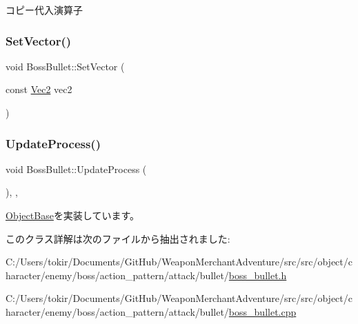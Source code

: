コピー代入演算子 

\mbox{\label{class_boss_bullet_a29bc4989a8b16a9da0daa3da92fb0e0a}} 
\subsubsection{\texorpdfstring{Set\+Vector()}{SetVector()}}
{\footnotesize\ttfamily void Boss\+Bullet\+::\+Set\+Vector (\begin{DoxyParamCaption}\item[{const \mbox{\hyperlink{common_8h_ae148fff5818e9444b4ab2288829559bf}{Vec2}}}]{vec2 }\end{DoxyParamCaption})\hspace{0.3cm}{\ttfamily [inline]}}

\mbox{\label{class_boss_bullet_a8e9923194c03eb0d4225ed8dae409f29}} 
\subsubsection{\texorpdfstring{Update\+Process()}{UpdateProcess()}}
{\footnotesize\ttfamily void Boss\+Bullet\+::\+Update\+Process (\begin{DoxyParamCaption}{ }\end{DoxyParamCaption})\hspace{0.3cm}{\ttfamily [final]}, {\ttfamily [protected]}, {\ttfamily [virtual]}}



\mbox{\hyperlink{class_object_base_a8b5b72b363a419767efde0b0e692ea95}{Object\+Base}}を実装しています。



このクラス詳解は次のファイルから抽出されました\+:\begin{DoxyCompactItemize}
\item 
C\+:/\+Users/tokir/\+Documents/\+Git\+Hub/\+Weapon\+Merchant\+Adventure/src/src/object/character/enemy/boss/action\+\_\+pattern/attack/bullet/\mbox{\hyperlink{boss__bullet_8h}{boss\+\_\+bullet.\+h}}\item 
C\+:/\+Users/tokir/\+Documents/\+Git\+Hub/\+Weapon\+Merchant\+Adventure/src/src/object/character/enemy/boss/action\+\_\+pattern/attack/bullet/\mbox{\hyperlink{boss__bullet_8cpp}{boss\+\_\+bullet.\+cpp}}\end{DoxyCompactItemize}
